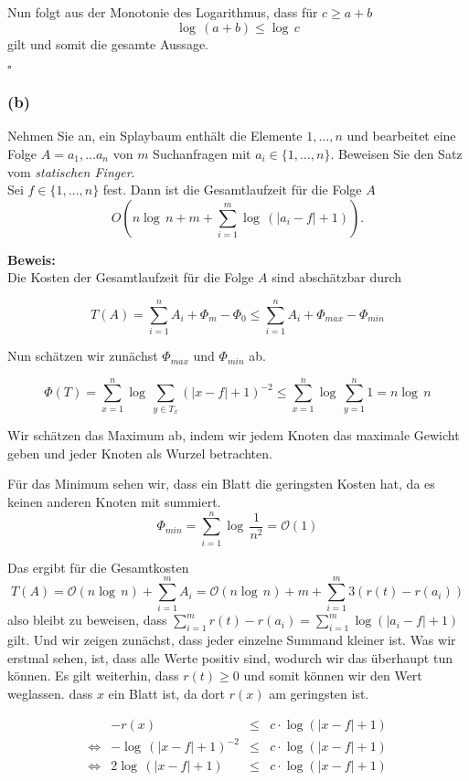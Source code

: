 \documentclass[11pt,a4paper,ngerman]{article}
\begin{document}
Nun folgt aus der Monotonie des Logarithmus, dass für $c \geq a+b$
$$
   \log \, (a+b) \leq \log \, c
$$
gilt und somit die gesamte Aussage.

\mbox{}\hfill$\square$

\subsubsection*{(b)}

Nehmen Sie an, ein Splaybaum enthält die Elemente $1, \ldots, n$ und bearbeitet eine Folge $A = a_1, \ldots a_n$ von $m$ Suchanfragen mit $a_i\in\{1,\ldots,n\}$. Beweisen Sie den Satz vom \emph{statischen Finger}.\\

Sei $f\in\{1,\ldots,n\}$ fest. Dann ist die Gesamtlaufzeit für die Folge $A$
$$
   O(n \log \, n + m + \sum_{i=1}^m \log \, (|a_i - f| + 1)).
$$

\noindent\textbf{Beweis:}\\

Die Kosten der Gesamtlaufzeit für die Folge $A$ sind abschätzbar durch

$$
	T(A) = \sum_{i=1}^n A_i + \Phi_m - \Phi_0 \leq \sum_{i=1}^n A_i + \Phi_{max} - \Phi_{min}
$$

Nun schätzen wir zunächst $\Phi_{max}$ und $\Phi_{min}$ ab. 

$$
	\Phi(T) = \sum_{x=1}^n \log \, \sum_{y \in T_x} \left(|x - f| + 1\right)^{-2} \leq \sum_{x=1}^n \log \, \sum_{y=1}^n 1 = n \log \, n
$$

Wir schätzen das Maximum ab, indem wir jedem Knoten das maximale Gewicht geben und jeder Knoten als Wurzel betrachten.

Für das Minimum sehen wir, dass ein Blatt die geringsten Kosten hat, da es keinen anderen Knoten mit summiert.
$$
	\Phi_{min} = \sum_{i=1}^n \log \, \frac{1}{n^2} = \mathcal{O}(1)
$$

Das ergibt für die Gesamtkosten
$$
	T(A) = \mathcal{O}(n \log \, n) + \sum_{i=1}^m A_i = \mathcal{O}(n \log \, n) + m + \sum_{i=1}^m 3(r(t) - r(a_i))
$$
also bleibt zu beweisen, dass $\sum_{i=1}^m r(t) - r(a_i) = \sum_{i=1}^m \log (|a_i - f| + 1)$ gilt. Und wir zeigen
zunächst, dass jeder einzelne Summand kleiner ist. Was wir erstmal sehen, ist, dass alle Werte positiv sind, wodurch
wir das überhaupt tun können. Es gilt weiterhin, dass $r(t) \geq 0$ und somit können wir den Wert weglassen.
dass $x$ ein Blatt ist, da dort $r(x)$ am geringsten ist.

$$\begin{array}{crcl}
	&  - r(x) &\leq& c \cdot \log (|x - f| + 1)\\ 
\Leftrightarrow & - \log \, (|x - f| + 1)^{-2} & \leq & c \cdot \log (|x - f|+ 1)\\
\Leftrightarrow & 2 \log \, (|x - f| + 1) & \leq & c \cdot \log (|x - f| + 1)
\end{array}$$
\end{document}
